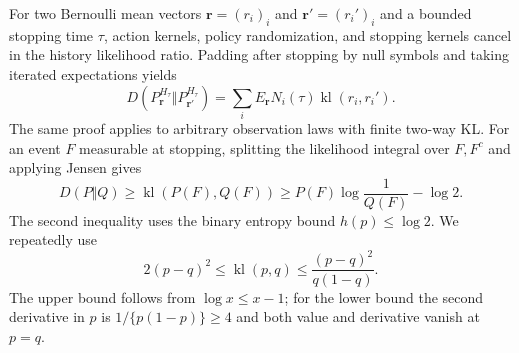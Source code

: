 For two Bernoulli mean vectors $\boldsymbol r=(r_i)_i$ and
$\boldsymbol r'=(r_i')_i$ and a bounded stopping time $\tau$, action
kernels, policy randomization, and stopping kernels cancel in the history
likelihood ratio. Padding after stopping by null symbols and taking iterated
expectations yields
\begin{equation}
 D(P_{\boldsymbol r}^{H_\tau}\Vert P_{\boldsymbol r'}^{H_\tau})
 =\sum_iE_{\boldsymbol r} N_i(\tau)\operatorname{kl}(r_i,r_i').
 \label{eq:app_kl_identity}
\end{equation}
The same proof applies to arbitrary observation laws with finite two-way KL.
For an event $F$ measurable at stopping, splitting the likelihood integral
over $F,F^c$ and applying Jensen gives
\[
 D(P\Vert Q)\ge\operatorname{kl}(P(F),Q(F))
 \ge P(F)\log\frac1{Q(F)}-\log2.
\]
The second inequality uses the binary entropy bound $h(p)\le\log2$. We repeatedly use
\[
 2(p-q)^2\le\operatorname{kl}(p,q)
 \le\frac{(p-q)^2}{q(1-q)}.
\]
The upper bound follows from $\log x\le x-1$; for the lower bound the second
derivative in $p$ is $1/\{p(1-p)\}\ge4$ and both value and derivative vanish
at $p=q$.
